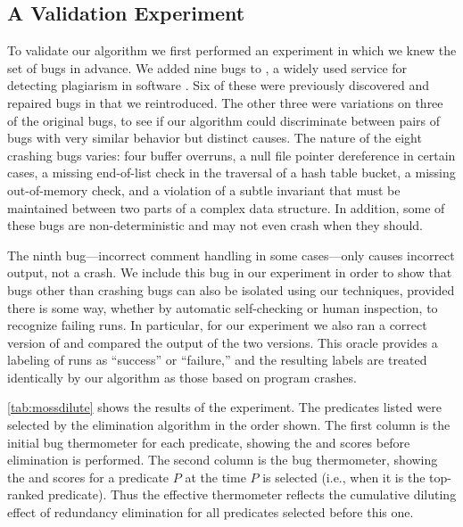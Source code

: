 \subsection{A Validation Experiment}

To validate our algorithm we first performed an experiment in which we
knew the set of bugs in advance.  We added nine bugs to \moss, a
widely used service for detecting plagiarism in software
\cite{Schleimer:2003:WLA}.  Six of these were previously discovered
and repaired bugs in \moss that we reintroduced.  The other three were
variations on three of the original bugs, to see if our algorithm could
discriminate between pairs of bugs with very similar behavior but
distinct causes.  The nature of the eight crashing bugs varies: four
buffer overruns, a null file pointer dereference in certain cases, a
missing end-of-list check in the traversal of a hash table bucket, a missing
out-of-memory check, and a violation of a subtle invariant that must be maintained between two
parts of a complex data structure.  In addition, some of these bugs
are non-deterministic and may not even crash when they should.

The ninth bug---incorrect comment handling in some cases---only
causes incorrect output, not a crash.  We include this bug in our
experiment in order to show that bugs other than crashing bugs can 
also be isolated using our techniques, provided there is some 
way, whether by automatic self-checking or human inspection, to recognize
failing runs.  In particular, for our experiment we also ran a correct 
version of \moss{} and compared the output of the two versions. 
This oracle provides a labeling of runs as ``success'' or ``failure,'' 
and the resulting labels are treated identically by our algorithm as
those based on program crashes.



\autoref{tab:mossdilute} shows the results of the experiment.  The
predicates listed were selected by the elimination algorithm in the
order shown.  The first column is the initial bug thermometer for each
predicate, showing the \context{} and \increase{} scores before
elimination is performed. The second column is the 
bug thermometer, showing the \context{} and \increase{} scores for a
predicate $P$ at the time $P$ is selected (i.e., when it is the
top-ranked predicate).  Thus the effective thermometer reflects the
cumulative diluting effect of redundancy elimination for all
predicates selected before this one.

